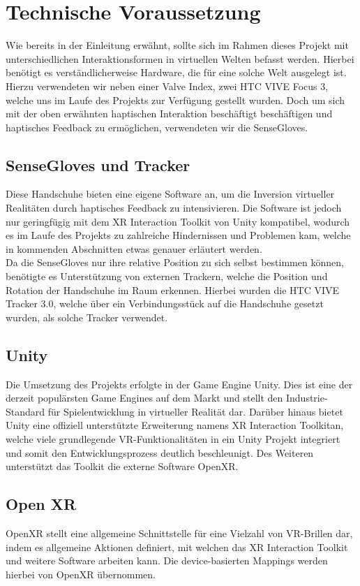 \section{Technische Voraussetzung}
Wie bereits in der Einleitung erwähnt, sollte sich im Rahmen dieses Projekt mit unterschiedlichen Interaktionsformen in virtuellen Welten befasst werden. Hierbei benötigt es verständlicherweise Hardware, die für eine solche Welt ausgelegt ist. Hierzu verwendeten wir neben einer Valve Index, zwei HTC VIVE Focus 3, welche uns im Laufe des Projekts zur Verfügung gestellt wurden. Doch um sich mit der oben erwähnten haptischen Interaktion beschäftigt beschäftigen und haptisches Feedback zu ermöglichen, verwendeten wir die \dq SenseGloves\dq. 

\subsection{SenseGloves und Tracker}
Diese Handschuhe bieten eine eigene Software an, um die Inversion virtueller Realitäten durch haptisches Feedback zu intensivieren. Die Software ist jedoch nur geringfügig mit dem XR Interaction Toolkit von Unity kompatibel, wodurch es im Laufe des Projekts zu zahlreiche Hindernissen und Problemen kam, welche in kommenden Abschnitten etwas genauer erläutert werden.\\ 
\noindent Da die SenseGloves nur ihre relative Position zu sich selbst bestimmen können, benötigte es Unterstützung von externen Trackern, welche die Position und Rotation der Handschuhe im Raum erkennen. Hierbei wurden die \dq HTC VIVE Tracker 3.0\dq, welche über ein Verbindungsstück auf die Handschuhe gesetzt wurden, als solche Tracker verwendet.

\newpage \noindent
\subsection{Unity}
Die Umsetzung des Projekts erfolgte in der Game Engine \dq Unity\dq. Dies ist eine der derzeit populärsten Game Engines auf dem Markt und stellt den Industrie-Standard für Spielentwicklung in virtueller Realität dar. Darüber hinaus bietet Unity eine offiziell unterstützte Erweiterung namens \dq XR Interaction Toolkit\dq an, welche viele grundlegende VR-Funktionalitäten in ein Unity Projekt integriert und somit den Entwicklungsprozess deutlich beschleunigt. Des Weiteren unterstützt das Toolkit die externe Software \dq OpenXR\dq.

\subsection{Open XR}
OpenXR stellt eine allgemeine Schnittstelle für eine Vielzahl von VR-Brillen dar, indem es allgemeine Aktionen definiert, mit welchen das XR Interaction Toolkit und weitere Software arbeiten kann. Die device-basierten Mappings werden hierbei von OpenXR übernommen.

